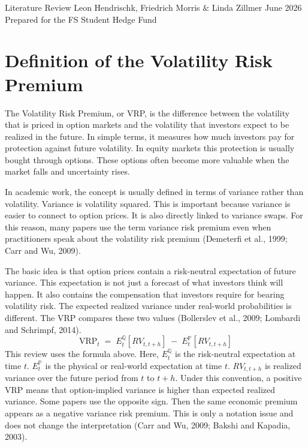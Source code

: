 \documentclass[11pt,a4paper]{article}
\begin{document}
%
{Literature Review}%
{Leon Hendrischk, Friedrich Morris \& Linda Zillmer}%
{June 2026}%
{Prepared for the FS Student Hedge Fund}

\setcounter{tocdepth}{2}
\tableofcontents
\clearpage

\section{Definition of the Volatility Risk Premium}

The Volatility Risk Premium, or VRP, is the difference between the volatility that is priced in option markets and the volatility that investors expect to be realized in the future. In simple terms, it measures how much investors pay for protection against future volatility. In equity markets this protection is usually bought through options. These options often become more valuable when the market falls and uncertainty rises.

In academic work, the concept is usually defined in terms of variance rather than volatility. Variance is volatility squared. This is important because variance is easier to connect to option prices. It is also directly linked to variance swaps. For this reason, many papers use the term variance risk premium even when practitioners speak about the volatility risk premium (Demeterfi et al., 1999; Carr and Wu, 2009).

The basic idea is that option prices contain a risk-neutral expectation of future variance. This expectation is not just a forecast of what investors think will happen. It also contains the compensation that investors require for bearing volatility risk. The expected realized variance under real-world probabilities is different. The VRP compares these two values (Bollerslev et al., 2009; Lombardi and Schrimpf, 2014).
\begin{equation*}
\mathrm{VRP}_{t} \;=\; E_{t}^{\mathbb{Q}}\!\left[RV_{t,t+h}\right] \;-\; E_{t}^{\mathbb{P}}\!\left[RV_{t,t+h}\right]
\end{equation*}
This review uses the formula above. Here, \(E_{t}^{\mathbb{Q}}\) is the risk-neutral expectation at time \(t\). \(E_{t}^{\mathbb{P}}\) is the physical or real-world expectation at time \(t\). \(RV_{t,t+h}\) is realized variance over the future period from \(t\) to \(t+h\). Under this convention, a positive VRP means that option-implied variance is higher than expected realized variance. Some papers use the opposite sign. Then the same economic premium appears as a negative variance risk premium. This is only a notation issue and does not change the interpretation (Carr and Wu, 2009; Bakshi and Kapadia, 2003).
\end{document}
